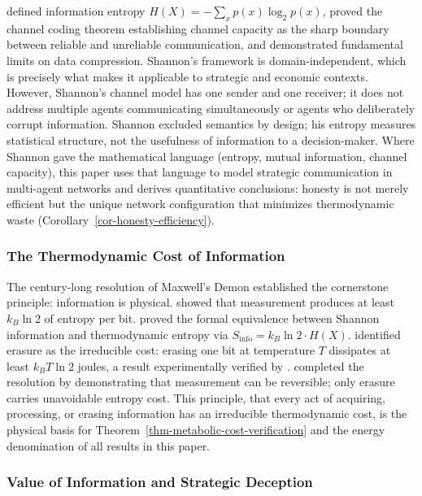 \documentclass[11pt]{article}
\theoremstyle{plain}
\theoremstyle{definition}
\theoremstyle{remark}
\let\origsubsubsection\subsubsection
\renewcommand{\subsubsection}{\needspace{4\baselineskip}\origsubsubsection}
\begin{document}
\citet{Shannon1948} defined information entropy
\(H(X) = -\sum_x p(x) \log_2 p(x)\), proved the channel coding theorem
establishing channel capacity as the sharp boundary between reliable and
unreliable communication, and demonstrated fundamental limits on data
compression. Shannon's framework is domain-independent, which is
precisely what makes it applicable to strategic and economic contexts.
However, Shannon's channel model has one sender and one receiver; it
does not address multiple agents communicating simultaneously or agents
who deliberately corrupt information. Shannon excluded semantics by
design; his entropy measures statistical structure, not the usefulness
of information to a decision-maker. Where Shannon gave the mathematical
language (entropy, mutual information, channel capacity), this paper
uses that language to model strategic communication in multi-agent
networks and derives quantitative conclusions: honesty is not merely
efficient but the unique network configuration that minimizes
thermodynamic waste (Corollary~\ref{cor-honesty-efficiency}).

\subsubsection{The Thermodynamic Cost of
Information}\label{the-thermodynamic-cost-of-information}

The century-long resolution of Maxwell's Demon established the
cornerstone principle: information is physical. \citet{Szilard1929}
showed that measurement produces at least \(k_B \ln 2\) of entropy per
bit. \citeauthor{Brillouin1951}
\citetext{\citeyear{Brillouin1951}; \citeyear{Brillouin1962}} proved the
formal equivalence between Shannon information and thermodynamic entropy
via \(S_{\text{info}} = k_B \ln 2 \cdot H(X)\). \citet{Landauer1961}
identified erasure as the irreducible cost: erasing one bit at
temperature \(T\) dissipates at least \(k_B T \ln 2\) joules, a result
experimentally verified by \citet{Berut2012}. \citeauthor{Bennett1973}
\citetext{\citeyear{Bennett1973}; \citeyear{Bennett1982}} completed the
resolution by demonstrating that measurement can be reversible; only
erasure carries unavoidable entropy cost. This principle, that every act
of acquiring, processing, or erasing information has an irreducible
thermodynamic cost, is the physical basis for
Theorem~\ref{thm-metabolic-cost-verification} and the energy
denomination of all results in this paper.

\subsubsection{Value of Information and Strategic
Deception}\label{value-of-information-and-strategic-deception}
\end{document}

